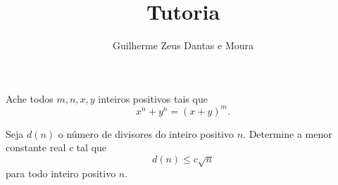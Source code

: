 \documentclass[10pt,a4paper]{scrartcl}
\title{Tutoria}
\author{Guilherme Zeus Dantas e Moura}
\begin{document}
	
	\zeustitle


	\begin{prob}
		Ache todos \(m, n, x, y\) inteiros positivos tais que  \[
			x^n + y^n = (x+y)^m.
		\]
	\end{prob}

	\begin{prob}
		Seja \(d(n)\) o número de divisores do inteiro positivo \(n\). Determine a menor constante real \(c\) tal que \[
			d(n) \leq c \sqrt{n}
		\]
		para todo inteiro positivo \(n\).
	\end{prob}


\end{document}
